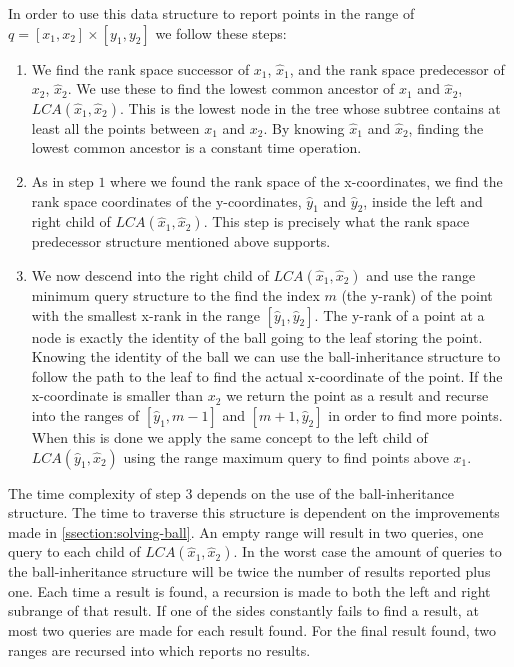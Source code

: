 In order to use this data structure to report points in the range of $q = [x_1, x_2] \times [y_1, y_2]$ we follow these steps:
\begin{enumerate}
  \item We find the rank space successor of $x_1$, $\hat{x}_1$, and the rank space predecessor of $x_2$, $\hat{x}_2$. We use these to find the lowest common ancestor of $\hat{x}_1$ and $\hat{x}_2$, $LCA(\hat{x}_1, \hat{x}_2)$. This is the lowest node in the tree whose subtree contains at least all the points between $x_1$ and $x_2$. By knowing $\hat{x}_1$ and $\hat{x}_2$, finding the lowest common ancestor is a constant time operation.   
  \item As in step $1$ where we found the rank space of the x-coordinates, we find the rank space coordinates of the y-coordinates, $\hat{y}_1$ and $\hat{y}_2$, inside the left and right child of $LCA(\hat{x}_1, \hat{x}_2)$. This step is precisely what the rank space predecessor structure mentioned above supports.
  \item We now descend into the right child of $LCA(\hat{x}_1, \hat{x}_2)$ and use the range minimum query structure to the find the index $m$ (the y-rank) of the point with the smallest x-rank in the range $[\hat{y}_1, \hat{y}_2]$. The y-rank of a point at a node is exactly the identity of the ball going to the leaf storing the point. Knowing the identity of the ball we can use the ball-inheritance structure to follow the path to the leaf to find the actual x-coordinate of the point. If the x-coordinate is smaller than $x_2$ we return the point as a result and recurse into the ranges of $[\hat{y}_1, m-1]$ and $[m+1, \hat{y}_2]$ in order to find more points. When this is done we apply the same concept to the left child of $LCA(\hat{y}_1, \hat{x}_2)$ using the range maximum query to find points above $x_1$.
\end{enumerate}


The time complexity of step $3$ depends on the use of the ball-inheritance structure. The time to traverse this structure is dependent on the improvements made in \ref{ssection:solving-ball}. An empty range will result in two queries, one query to each child of $LCA(\hat{x}_1, \hat{x}_2)$. In the worst case the amount of queries to the ball-inheritance structure will be twice the number of results reported plus one. Each time a result is found, a recursion is made to both the left and right subrange of that result. If one of the sides constantly fails to find a result, at most two queries are made for each result found. For the final result found, two ranges are recursed into which reports no results.

